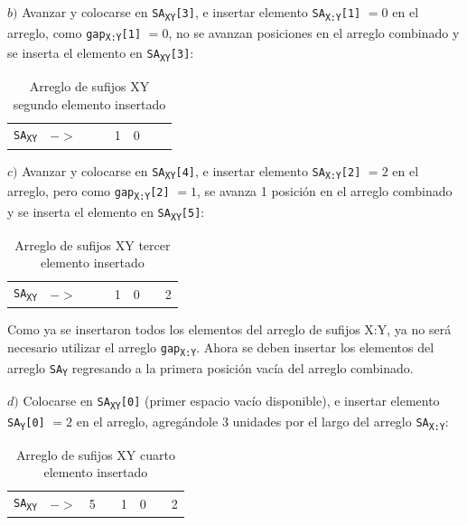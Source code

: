 $b)$ Avanzar y colocarse en \texttt{SA\textsubscript{XY}[3]}, e insertar elemento \texttt{SA\textsubscript{X:Y}[1]} $= 0$ en el arreglo, como \texttt{gap\textsubscript{X:Y}[1]} $= 0$, no se avanzan posiciones en el arreglo combinado y se inserta el elemento en \texttt{SA\textsubscript{XY}[3]}:

\begin{table}[!hbt]
\centering
\begin{tabular}{cc|c|c|c|c|c|c|}
\cline{3-8}
\texttt{SA\textsubscript{XY}} &  $->$ &  &  & 1 & 0 &  &  \\ \cline{3-8} 
\end{tabular}
\caption{Arreglo de sufijos XY segundo elemento insertado}
\end{table}

$c)$ Avanzar y colocarse en \texttt{SA\textsubscript{XY}[4]}, e insertar elemento \texttt{SA\textsubscript{X:Y}[2]} $= 2$ en el arreglo, pero como \texttt{gap\textsubscript{X:Y}[2]} $= 1$, se avanza 1 posición en el arreglo combinado y se inserta el elemento en \texttt{SA\textsubscript{XY}[5]}:

\begin{table}[!hbt]
\centering
\begin{tabular}{cc|c|c|c|c|c|c|}
\cline{3-8}
\texttt{SA\textsubscript{XY}} &  $->$ &  &  & 1 & 0 &  & 2 \\ \cline{3-8} 
\end{tabular}
\caption{Arreglo de sufijos XY tercer elemento insertado}
\end{table}

Como ya se insertaron todos los elementos del arreglo de sufijos X:Y, ya no será necesario utilizar el arreglo \texttt{gap\textsubscript{X:Y}}. Ahora se deben insertar los elementos del arreglo \texttt{SA\textsubscript{Y}} regresando a la primera posición vacía del arreglo combinado.

$d)$ Colocarse en \texttt{SA\textsubscript{XY}[0]} (primer espacio vacío disponible), e insertar elemento \texttt{SA\textsubscript{Y}[0]} $= 2$ en el arreglo, agregándole 3 unidades por el largo del arreglo \texttt{SA\textsubscript{X:Y}}:

\begin{table}[!hbt]
\centering
\begin{tabular}{cc|c|c|c|c|c|c|}
\cline{3-8}
\texttt{SA\textsubscript{XY}} &  $->$ & 5 &  & 1 & 0 &  & 2 \\ \cline{3-8} 
\end{tabular}
\caption{Arreglo de sufijos XY cuarto elemento insertado}
\end{table}

